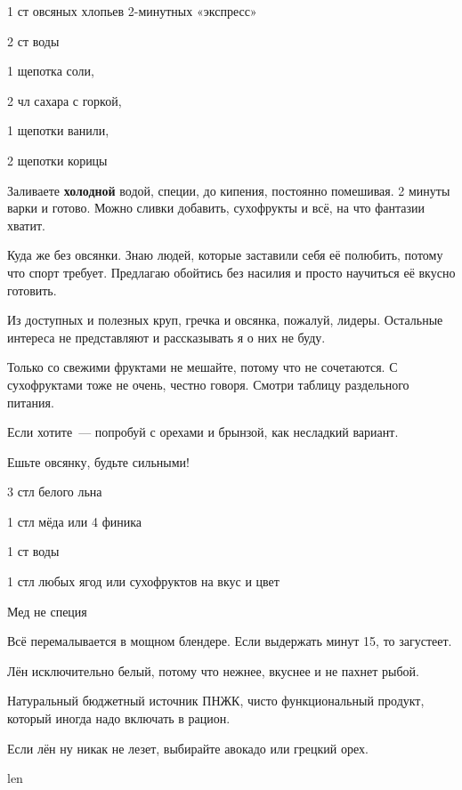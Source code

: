 {
\item 1 ст овсяных хлопьев 2-минутных «экспресс»
\item 2 ст воды 
}{
\item 1 щепотка соли, 
\item 2 чл сахара с горкой, 
\item 1 щепотки ванили, 
\item 2 щепотки корицы
}{
Заливаете \textbf{холодной} водой, специи, до кипения, постоянно помешивая. 2 минуты варки и готово. Можно сливки добавить, сухофрукты и всё, на что фантазии хватит. 
}{
\begin{advice}
\item Куда же без овсянки. Знаю людей, которые заставили себя её полюбить, потому что спорт требует. Предлагаю обойтись без насилия и просто научиться её вкусно готовить.
\item Из доступных и полезных круп, гречка и овсянка, пожалуй, лидеры. Остальные интереса не представляют и рассказывать я о них не буду.
\item Только со свежими фруктами не мешайте, потому что не сочетаются. С сухофруктами тоже не очень, честно говоря. Смотри таблицу раздельного питания. 
    \item Если хотите~--- попробуй с орехами и брынзой, как несладкий вариант.
\item Ешьте овсянку, будьте сильными!
\end{advice}}{}



{
\item 3 стл белого льна
\item 1 стл мёда или 4 финика
\item 1 ст воды
\item 1 стл любых ягод или сухофруктов на вкус и цвет
}{
\item Мед не специя \faSmileO
}{
Всё перемалывается в мощном блендере. Если выдержать минут 15, то загустеет.
}{
\begin{advice}
\item Лён исключительно белый, потому что нежнее, вкуснее и не пахнет рыбой. 
\item Натуральный бюджетный источник ПНЖК, чисто функциональный продукт, который иногда надо включать в рацион. 
\item Если лён ну никак не лезет, выбирайте авокадо или грецкий орех.
\end{advice}}{len}





